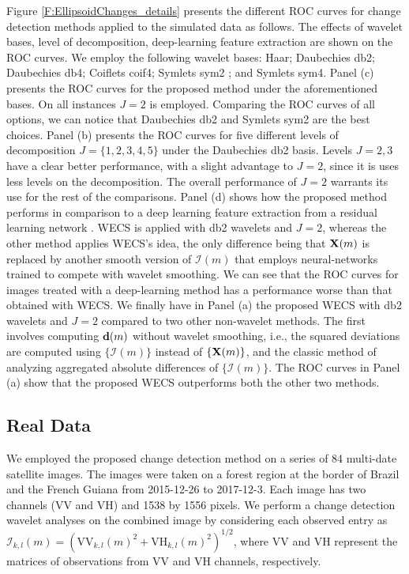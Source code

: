 \documentclass[journal]{IEEEtran}
\newcommand{\vd}{{\textbf d}}
\newcommand{\vX}{{\textbf X}}
\begin{document}
Figure \ref{F:EllipsoidChanges_details} presents the different ROC curves for change detection methods applied to the simulated data as follows. The effects of wavelet bases, level of decomposition, deep-learning feature extraction are shown on the ROC curves. We employ the following wavelet bases: Haar;  Daubechies db2; Daubechies db4; Coiflets coif4; Symlets sym2 ; and Symlets sym4. Panel (c) presents the ROC curves for the proposed method under the aforementioned bases. On all instances $J=2$ is employed. Comparing the ROC curves of all options, we can notice that Daubechies db2 and Symlets sym2 are the best choices.  Panel (b) presents the ROC curves for five different levels of decomposition $J=\{1,2,3,4,5\}$ under the Daubechies db2 basis. Levels $J=2,3$ have a clear better performance, with a slight advantage to $J=2$, since it is uses less levels on the decomposition. The overall performance  of $J=2$ warrants its use for the rest of the comparisons. Panel (d) shows how the proposed method performs in comparison to a deep learning feature extraction from a residual learning network \cite{zhang2017beyond}. WECS is applied with db2 wavelets and $J=2$, whereas the other method applies WECS's idea, the only difference being that $\vX(m)$ is replaced by another smooth version of $\mathcal{I}(m)$ that employs neural-networks trained to compete with wavelet smoothing. We can see that the ROC curves for images treated with a deep-learning method has a performance worse than that obtained with WECS. 
We finally have in Panel (a) the proposed WECS with db2 wavelets and $J=2$ compared to two other non-wavelet methods. The first involves computing $\vd(m)$ without wavelet smoothing, i.e., the squared deviations are computed using $\{\mathcal{I}(m)\}$ instead of $\{\vX(m)\}$, and the classic method of analyzing aggregated absolute differences of $\{\mathcal{I}(m)\}$. The ROC curves in Panel (a) show that the proposed WECS outperforms both the other two methods. 



\subsection{Real Data}
\label{section_realdata}

We employed the proposed change detection method on a series of 84 multi-date satellite images. The images were taken on a forest region at the border of Brazil and the French Guiana from 2015-12-26 to 2017-12-3. Each image has two channels (VV and VH) and 1538 by 1556 pixels. We perform a change detection wavelet analyses on the combined image by considering each observed entry as $\mathcal{I}_{k,l}(m) = (\mathrm{VV}_{k,l}(m)^2+\mathrm{VH}_{k,l}(m)^2)^{1/2}$, where $\mathrm{VV}$ and $\mathrm{VH}$ represent the matrices of observations from VV and VH channels, respectively. 
\end{document}

